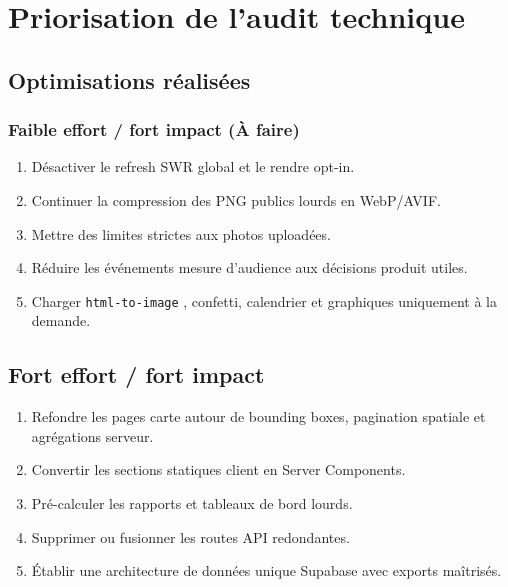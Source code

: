 \documentclass[
  10pt,
  a4paper,
  DIV=11,
  numbers=noendperiod,
  oneside]{scrreprt}
\begin{document}
\section{Priorisation de l'audit
technique}\label{priorisation-de-laudit-technique}

\subsection{Optimisations
réalisées}\label{optimisations-ruxe9alisuxe9es}

\subsubsection{Faible effort / fort impact (À
faire)}\label{faible-effort-fort-impact-uxe0-faire}

\begin{enumerate}
\def\labelenumi{\arabic{enumi}.}
\item
  Désactiver le refresh SWR global et le rendre opt-in.
\item
  Continuer la compression des PNG publics lourds en WebP/AVIF.
\item
  Mettre des limites strictes aux photos uploadées.
\item
  Réduire les événements mesure d'audience aux décisions produit utiles.
\item
  Charger \texttt{html-to-image} , confetti, calendrier et graphiques
  uniquement à la demande.
\end{enumerate}

\subsection{Fort effort / fort impact}\label{fort-effort-fort-impact}

\begin{enumerate}
\def\labelenumi{\arabic{enumi}.}
\item
  Refondre les pages carte autour de bounding boxes, pagination spatiale
  et agrégations serveur.
\item
  Convertir les sections statiques client en Server Components.
\item
  Pré-calculer les rapports et tableaux de bord lourds.
\item
  Supprimer ou fusionner les routes API redondantes.
\item
  Établir une architecture de données unique Supabase avec exports
  maîtrisés.
\end{enumerate}
\end{document}
